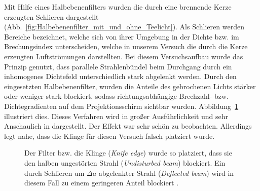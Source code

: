 Mit Hilfe eines Halbebenenfilters wurden die durch eine brennende Kerze erzeugten Schlieren dargestellt (Abb.~\ref{fig:Halbebenenfilter_mit_und_ohne_Teelicht}). Als Schlieren werden Bereiche bezeichnet, welche sich von ihrer Umgebung in der Dichte  bzw. im Brechungsindex unterscheiden, welche in unserem Versuch die durch  die Kerze erzeugten Luftströmungen darstellten. Bei diesem Versuchsaufbau  wurde das Prinzip genutzt, dass parallele Strahlenbündel beim  Durchgang durch ein inhomogenes Dichtefeld unterschiedlich stark abgelenkt werden. Durch den eingesetzten Halbebenenfilter, wurden die Anteile des gebrochenen  Lichts stärker oder weniger stark blockiert, sodass richtungsabhängige Brechzahl- bzw. Dichtegradienten auf dem Projektionsschirm sichtbar wurden. Abbildung~\ref{fig:schlieren_expl} illustriert dies. %
Dieses Verfahren wird in großer Ausführlichkeit und sehr Anschaulich in 
\cite[Kapitel 2]{panigrahi_schlieren_2012} dargestellt. Der Effekt war sehr schön zu beobachten. Allerdings legt 
\cite[Fig. 2.2]{panigrahi_schlieren_2012} nahe, dass die Klinge für diesen Versuch falsch platziert wurde.

\begin{figure}[h]
	\centering
	\caption[Anschauliche Erklärung des Schlierenverfahrens]{
		Der Filter bzw. die Klinge (\textit{Knife edge}) wurde so platziert, dass sie den halben ungestörten Strahl (\textit{Undisturbed beam}) blockiert. Ein durch Schlieren um $\Delta a$ abgelenkter Strahl (\textit{Deflected beam}) wird in diesem Fall zu einem geringeren Anteil blockiert \cite[Fig. 2.5]{panigrahi_schlieren_2012}.
	}
	\label{fig:schlieren_expl}
\end{figure}


